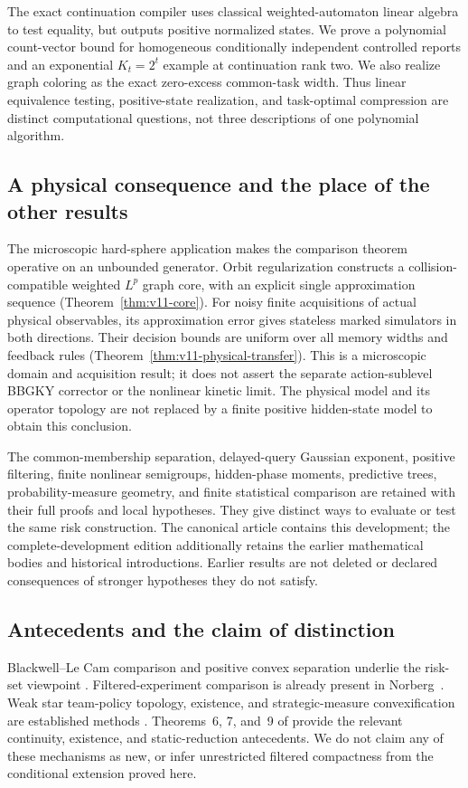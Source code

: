 The exact continuation compiler uses classical weighted-automaton linear
algebra to test equality, but outputs positive normalized states. We prove
a polynomial count-vector bound for homogeneous conditionally independent
controlled reports and an exponential $K_t=2^t$ example at continuation
rank two. We also realize graph coloring as the exact zero-excess
common-task width. Thus linear equivalence testing, positive-state
realization, and task-optimal compression are distinct computational
questions, not three descriptions of one polynomial algorithm.

\subsection{A physical consequence and the place of the other results}
The microscopic hard-sphere application makes the comparison theorem
operative on an unbounded generator. Orbit regularization constructs a
collision-compatible weighted $L^p$ graph core, with an explicit single
approximation sequence (Theorem~\ref{thm:v11-core}). For noisy finite
acquisitions of actual physical observables, its approximation error gives
stateless marked simulators in both directions. Their decision bounds are
uniform over all memory widths and feedback rules
(Theorem~\ref{thm:v11-physical-transfer}). This is a microscopic domain and
acquisition result; it does not assert the separate action-sublevel BBGKY
corrector or the nonlinear kinetic limit. The physical model and its
operator topology are not replaced by a finite positive hidden-state
model to obtain this conclusion.

The common-membership separation, delayed-query Gaussian exponent,
positive filtering, finite nonlinear semigroups, hidden-phase moments,
predictive trees, probability-measure geometry, and finite statistical
comparison are retained with their full proofs and local hypotheses.
They give distinct ways to evaluate or test the same risk construction.
The canonical article contains this development; the complete-development
edition additionally retains the earlier mathematical bodies and historical
introductions. Earlier results are not deleted or declared consequences
of stronger hypotheses they do not satisfy.

\subsection{Antecedents and the claim of distinction}
Blackwell--Le Cam comparison and positive convex separation underlie the
risk-set viewpoint \cite{Blackwell1953,LeCam1964,Torgersen1991}.
Filtered-experiment comparison is already present in
Norberg~\cite{Norberg2002}. Weak star team-policy topology, existence, and
strategic-measure convexification are established methods
\cite{Saldi2017Topology,YukselSaldi2017}. Theorems~6, 7, and~9 of
\cite{Saldi2017Topology} provide the relevant continuity, existence, and
static-reduction antecedents. We do not claim any of these mechanisms as
new, or infer unrestricted filtered compactness from the conditional
extension proved here.

